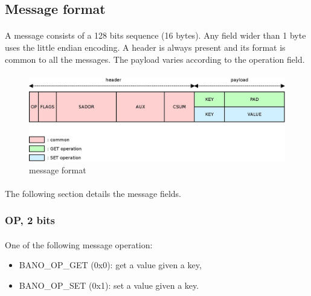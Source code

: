 \documentclass[a4paper, 11pt]{article}
\begin{document}


\subsection{Message format}

\paragraph{}
A message consists of a 128 bits sequence (16 bytes). Any field wider than 1
byte uses the little endian encoding. A header is always present and its format
is common to all the messages. The payload varies according to the operation
field.

\paragraph{}
\begin{figure}[!h]
\begin{center}
\includegraphics[scale=0.2]{../dia/implem_format/main.jpeg}
\end{center}
\caption{\tiny{message format}}
\label{implem_format}
\end{figure}


\paragraph{}
The following section details the message fields.

\subsubsection{OP, 2 bits}
\paragraph{}
One of the following message operation:
\begin{itemize}
\item BANO\_OP\_GET (0x0): get a value given a key,
\item BANO\_OP\_SET (0x1): set a value given a key.
\end{itemize}
\end{document}

